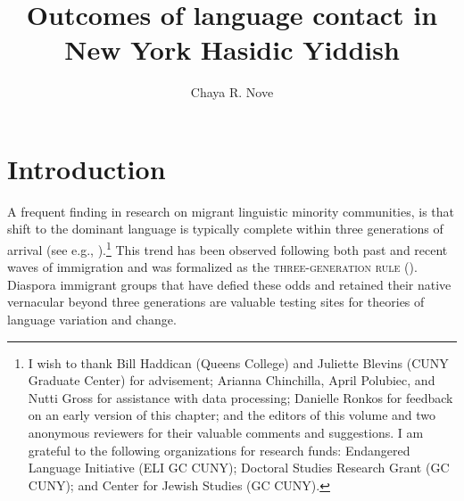 \documentclass[output=paper]{langsci/langscibook}
\author{Chaya R. Nove\affiliation{Graduate Center at City University of New York}}
\title[Language contact in Hasidic Yiddish]
      {Outcomes of language contact in New York Hasidic Yiddish}
\begin{document}
\maketitle 



\section{Introduction}
\label{sec:nove:1}

A frequent finding in research on migrant linguistic minority communities, is that shift to the dominant language is typically complete within three generations of arrival (see e.g., \citealt{Alba2004, AlbaEtAl2002, RumbautEtAl2006}).\footnote{I wish to thank Bill Haddican (Queens College) and Juliette Blevins (CUNY Graduate Center) for advisement; Arianna Chinchilla, April Polubiec, and Nutti Gross for assistance with data processing; Danielle Ronkos for feedback on an early version of this chapter; and the editors of this volume and two anonymous reviewers for their valuable comments and suggestions. I am grateful to the following organizations for research funds: Endangered Language Initiative (ELI GC CUNY); Doctoral Studies Research Grant (GC CUNY); and Center for Jewish Studies (GC CUNY).} This trend has been observed following both past and recent waves of immigration and was formalized as the \textsc{three-generation} \textsc{rule} (\citealt{Fishman1972, Haugen1953}). Diaspora immigrant groups that have defied these odds and retained their native vernacular beyond three generations are valuable testing sites for theories of language variation and change. 
\end{document}
